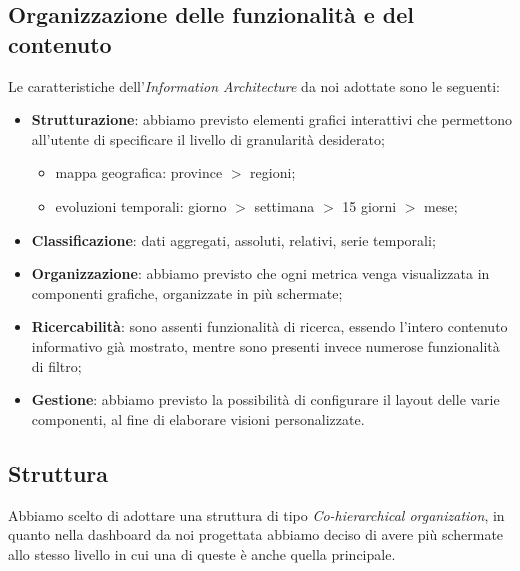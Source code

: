 \subsection{Organizzazione delle funzionalità e del contenuto}
\label{ss:organizzazione-funzionalita-contenuto}
Le caratteristiche dell'\textit{Information Architecture} da noi adottate sono le seguenti:
\begin{itemize}
	\item \textbf{Strutturazione}: abbiamo previsto elementi grafici interattivi che permettono all'utente di specificare il livello di granularità desiderato;
	\begin{itemize}
		\item mappa geografica: province $>$ regioni;
		\item evoluzioni temporali: giorno $>$ settimana $>$ 15 giorni $>$ mese;
	\end{itemize}
	\item \textbf{Classificazione}: dati aggregati, assoluti, relativi, serie temporali;
	\item \textbf{Organizzazione}: abbiamo previsto che ogni metrica venga visualizzata in componenti grafiche, organizzate in più schermate;
	\item \textbf{Ricercabilità}: sono assenti funzionalità di ricerca, essendo l'intero contenuto informativo già mostrato, mentre sono presenti invece numerose funzionalità di filtro;
	\item \textbf{Gestione}: abbiamo previsto la possibilità di configurare il layout delle varie componenti, al fine di elaborare visioni personalizzate.
\end{itemize}

\subsection{Struttura}
\label{ss:struttura}
Abbiamo scelto di adottare una struttura di tipo \textit{Co-hierarchical organization}, in quanto nella dashboard da noi progettata abbiamo deciso di avere più schermate allo stesso livello in cui una di queste è anche quella principale.